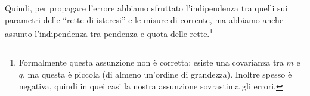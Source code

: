 Quindi, per propagare l'errore abbiamo sfruttato l'indipendenza tra quelli sui parametri delle ``rette di isteresi'' e le misure di corrente, ma abbiamo anche assunto l'indipendenza tra pendenza e quota delle rette.\footnote{Formalmente questa assunzione non è corretta: esiste una covarianza tra $ m $ e $ q $, ma questa è piccola (di almeno un'ordine di grandezza). Inoltre spesso è negativa, quindi in quei casi la nostra assunzione sovrastima gli errori.}

